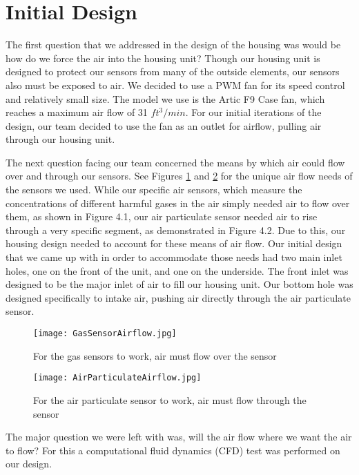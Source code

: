 \section{Initial Design}

The first question that we addressed in the design of the housing was would be how do we force the air into the housing unit? Though our housing unit is designed to protect our sensors from many of the outside elements, our sensors also must be exposed to air. We decided to use a PWM fan for its speed control and relatively small size. The model we use is the Artic F9 Case fan, which reaches a maximum air flow of 31 $ft^{3}/min$. For our initial iterations of the design, our team decided to use the fan as an outlet for airflow, pulling air through our housing unit.

The next question facing our team concerned the means by which air could flow over and through our sensors. See Figures \ref{fig:airflow1} and \ref{fig:airflow2} for the unique air flow needs of the sensors we used. While our specific air sensors, which measure the concentrations of different harmful gases in the air simply needed air to flow over them, as shown in Figure 4.1, our air particulate sensor needed air to rise through a very specific segment, as demonstrated in Figure 4.2. Due to this, our housing design needed to account for these means of air flow.  Our initial design that we came up with in order to accommodate those needs had two main inlet holes, one on the front of the unit, and one on the underside. The front inlet was designed to be the major inlet of air to fill  our housing unit. Our bottom hole was designed specifically to intake air, pushing air directly through the air particulate sensor.

\begin{figure}[H]
	\centering
	\texttt{[image: GasSensorAirflow.jpg]}
	\caption{For the gas sensors to work, air must flow over the sensor}
	\label{fig:airflow1}
\end{figure}

\begin{figure}[H]
	\centering
	\texttt{[image: AirParticulateAirflow.jpg]}
	\caption{For the air particulate sensor to work, air must flow through the sensor}
	\label{fig:airflow2}
\end{figure}

The major question we were left with was, will the air flow where we want the air to flow? For this a computational fluid dynamics (CFD) test was performed on our design.

